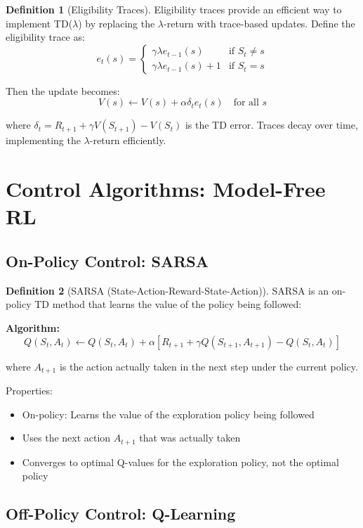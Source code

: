 \documentclass[12pt,a4paper]{article}
\theoremstyle{definition}
\newtheorem{definition}{Definition}[section]
\begin{document}
\begin{definition}[Eligibility Traces]
Eligibility traces provide an efficient way to implement TD($\lambda$) by replacing the $\lambda$-return with trace-based updates. Define the eligibility trace as:
\[
e_t(s) = \begin{cases}
\gamma \lambda e_{t-1}(s) & \text{if } S_t \neq s \\
\gamma \lambda e_{t-1}(s) + 1 & \text{if } S_t = s
\end{cases}
\]

Then the update becomes:
\[
V(s) \leftarrow V(s) + \alpha \delta_t e_t(s) \quad \text{for all } s
\]

where $\delta_t = R_{t+1} + \gamma V(S_{t+1}) - V(S_t)$ is the TD error. Traces decay over time, implementing the $\lambda$-return efficiently.
\end{definition}

\section{Control Algorithms: Model-Free RL}

\subsection{On-Policy Control: SARSA}

\begin{definition}[SARSA (State-Action-Reward-State-Action)]
SARSA is an on-policy TD method that learns the value of the policy being followed:

\textbf{Algorithm:}
\[
Q(S_t, A_t) \leftarrow Q(S_t, A_t) + \alpha [R_{t+1} + \gamma Q(S_{t+1}, A_{t+1}) - Q(S_t, A_t)]
\]

where $A_{t+1}$ is the action actually taken in the next step under the current policy.

Properties:
\begin{itemize}
    \item On-policy: Learns the value of the exploration policy being followed
    \item Uses the next action $A_{t+1}$ that was actually taken
    \item Converges to optimal Q-values for the exploration policy, not the optimal policy
\end{itemize}
\end{definition}

\subsection{Off-Policy Control: Q-Learning}
\end{document}
